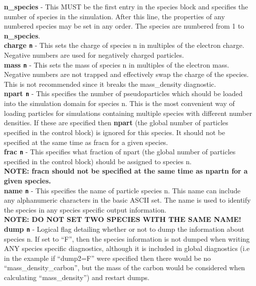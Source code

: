 \documentclass[12pt,a4paper]{article}
\newcommand{\emphtext}{\color{warwickdark} \fontfamily{phv}\selectfont\Large\bf}
\newcommand{\inlinecode}[1]{{\color{warwickred} \bf\texttt{#1}}}
\newcommand{\inlineemph}[1]{{\color{warwicklight} \bf{#1}}}
\begin{document}
{\emphtext n\_species} - This MUST be the first entry in the species block and
specifies the number of species in the simulation. After this line, the
properties of any numbered species may be set in any order. The species are
numbered from 1 to \inlineemph{n\_species}.\\

{\emphtext charge\inlinecode{n}} - This sets the charge of species n in
multiples of the electron charge. Negative numbers are used for negatively
charged particles.\\

{\emphtext mass\inlinecode{n}} - This sets the mass of species n in multiples
of the electron mass. Negative numbers are not trapped and effectively swap the
charge of the species. This is not recommended since it breaks the
mass\_density diagnostic.\\

{\emphtext npart\inlinecode{n}} - This specifies the number of pseudoparticles
which should be loaded into the simulation domain for species n. This is the
most convenient way of loading particles for simulations containing multiple
species with different number densities. If these are specified then
\inlineemph{npart} (the global number of particles specified in the control
block) is ignored for this species. It should not be specified at the same time
as fracn for a given species.\\

{\emphtext frac\inlinecode{n}} - This specifies what fraction of npart (the
global number of particles specified in the control block) should be assigned
to species n. \\

{\emphtext NOTE: fracn should not be specified at the same time as npartn for a
given species.}\\

{\emphtext name\inlinecode{n}} - This specifies the name of particle species
n. This name can include any alphanumeric characters in the basic ASCII
set. The name is used to identify the species in any species specific output
information. \\

{\emphtext NOTE: DO NOT SET TWO SPECIES WITH THE SAME NAME!}\\

{\emphtext dump\inlinecode{n}} - Logical flag detailing whether or not to dump
the information about species n. If set to ``F'', then the species information
is not dumped when writing ANY species specific diagnostics, although it is
included in global diagnostics (i.e in the example if ``dump2=F'' were specified
then there would be no ``mass\_density\_carbon'', but the mass of the carbon
would be considered when calculating ``mass\_density'') and restart dumps.\\
\end{document}
